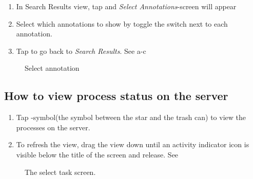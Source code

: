\begin{enumerate}
\item In Search Results view, tap  and \emph{Select Annotations}-screen will appear
\item Select which annotations to show by toggle the switch next to each annotation.
\item Tap  to go back to \emph{Search Results}. See a-c
\end{enumerate}

\begin{figure}[ht]
\caption{Select annotation}
\label{fig:ios_searchResult}
\end{figure}
\FloatBarrier

\subsection{How to view process status on the server}

\begin{enumerate}
\item Tap -symbol(the symbol between the star and the trash can) to view the processes on the server.
\item To refresh the view, drag the view down until an activity indicator icon is visible below the title of the screen and release. See 
\end{enumerate}

\begin{figure}[htb]
\caption{The select task screen.}
\label{fig:ios_processes}
\end{figure}
\FloatBarrier





